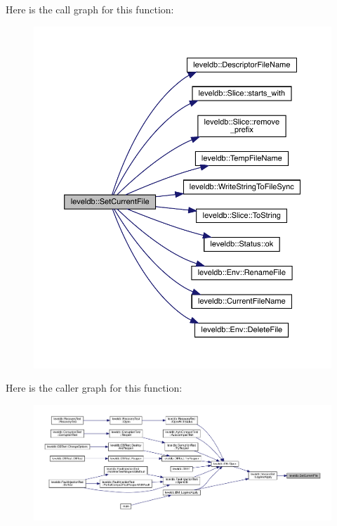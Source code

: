 Here is the call graph for this function\+:
\nopagebreak
\begin{figure}[H]
\begin{center}
\leavevmode
\includegraphics[width=350pt]{namespaceleveldb_a73133aa2e18928553d14913491b094e7_cgraph}
\end{center}
\end{figure}
Here is the caller graph for this function\+:
\nopagebreak
\begin{figure}[H]
\begin{center}
\leavevmode
\includegraphics[width=350pt]{namespaceleveldb_a73133aa2e18928553d14913491b094e7_icgraph}
\end{center}
\end{figure}
\mbox{\label{namespaceleveldb_a1a6a370f17b20667b885b5b91159c5a9}} 
